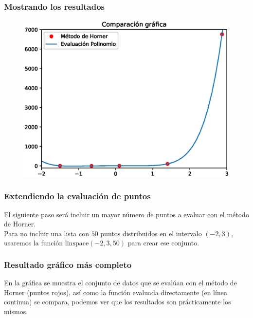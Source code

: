 \begin{frame}[fragile]
\frametitle{Mostrando los resultados}
\begin{figure}
	\centering
	\includegraphics[scale=0.55]{Imagenes/MetodoHorner_01.eps}
\end{figure}
\end{frame}
\begin{frame}[fragile]
\frametitle{Extendiendo la evaluación de puntos}
El siguiente paso será incluir un mayor número de puntos a evaluar con el método de Horner.
\\
\bigskip
\pause
Para no incluir una lista con $50$ puntos distribuidos en el intervalo $(-2, 3)$, usaremos la función $\mbox{linspace}(-2, 3, 50)$ para crear ese conjunto.
\end{frame}
\begin{frame}[fragile]
\frametitle{Resultado gráfico más completo}
En la gráfica se muestra el conjunto de datos que se evalúan con el método de Horner (puntos rojos), así como la función evaluada directamente (en línea continua) se compara, podemos ver que los resultados son prácticamente los mismos.
\end{frame}
